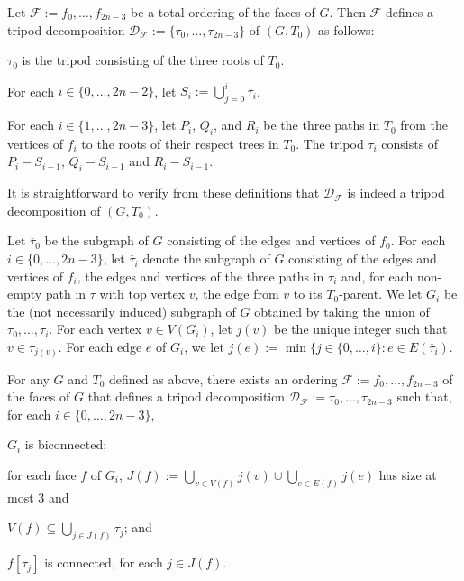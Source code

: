 \documentclass{patmorin}
\begin{document}
Let $\mathcal{F}:=f_0,\ldots,f_{2n-3}$ be a total ordering of the faces of $G$.  Then $\mathcal{F}$ defines a tripod decomposition $\mathcal{D}_\mathcal{F}:=\{\tau_0,\ldots,\tau_{2n-3}\}$ of $(G,T_0)$ as follows:
\begin{compactenum}
  \item $\tau_0$ is the tripod consisting of the three roots of $T_0$.
  \item For each $i\in\{0,\ldots,2n-2\}$, let $S_i:=\bigcup_{j=0}^i \tau_i$.
  \item For each $i\in\{1,\ldots,2n-3\}$, let $P_i$, $Q_i$, and $R_i$ be the three paths in $T_0$ from the vertices of $f_i$ to the roots of their respect trees in $T_0$.  The tripod $\tau_i$ consists of $P_i-S_{i-1}$, $Q_i-S_{i-1}$ and $R_i-S_{i-1}$.
\end{compactenum}
It is straightforward to verify from these definitions that $\mathcal{D}_\mathcal{F}$ is indeed a tripod decomposition of $(G,T_0)$.

Let $\overline{\tau}_0$ be the subgraph of $G$ consisting of the edges and vertices of $f_0$.  For each $i\in\{0,\ldots,2n-3\}$, let $\overline{\tau}_i$ denote the subgraph of $G$ consisting of the edges and vertices of $f_i$, the edges and vertices of the three paths in $\tau_i$ and, for each non-empty path in $\tau$ with top vertex $v$, the edge from $v$ to its $T_0$-parent.  We let $G_i$ be the (not necessarily induced) subgraph of $G$ obtained by taking the union of $\overline{\tau}_0,\ldots,\overline{\tau}_i$.  For each vertex $v\in V(G_i)$, let $j(v)$ be the unique integer such that $v\in \tau_{j(v)}$. For each edge $e$ of $G_i$, we let $j(e):=\min\{j\in\{0,\ldots,i\}:e\in E(\overline{\tau}_i)$.

\begin{lem}\label{face_trick}
  For any $G$ and $T_0$ defined as above, there exists an ordering $\mathcal{F}:=f_0,\ldots,f_{2n-3}$ of the faces of $G$ that defines a tripod decomposition $\mathcal{D}_\mathcal{F}:=\tau_0,\ldots,\tau_{2n-3}$ such that, for each $i\in\{0,\ldots,2n-3\}$,
  \begin{compactenum}[(i)]
    \item \label{biconnected} $G_i$ is biconnected;
    \item \label{three_faces} for each face $f$ of $G_i$, $J(f):=\bigcup_{v\in V(f)} j(v)\cup \bigcup_{e\in E(f)} j(e)$ has size at most $3$ and
    \begin{compactenum}[(a)]
      \item $V(f)\subseteq \bigcup_{j\in J(f)} \tau_{j}$; and
      \item $f[\tau_{j}]$ is connected, for each $j\in J(f)$.
    \end{compactenum}
  \end{compactenum}
\end{lem}
\end{document}
